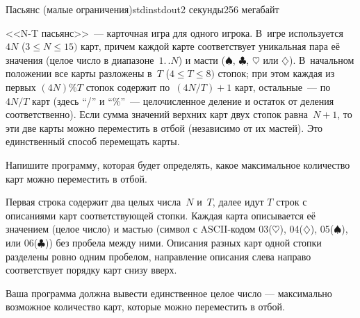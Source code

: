 \begin{problem}{Пасьянс (малые ограничения)}{stdin}{stdout}{2 секунды}{256 мегабайт}

<<N-T пасьянс>>~--- карточная игра для одного игрока. В~игре используется $4N$ 
($3\leqslant N\leqslant 15)$ карт, причем
каждой карте соответствует уникальная пара её значения (целое число 
в диапазоне~$1.\,.N$) и масти ($\spadesuit$, $\clubsuit$, $\heartsuit$
или $\diamondsuit$). В~начальном положении все карты разложены в~$T$ 
($4\leqslant T\leqslant 8)$ стопок; при этом каждая из первых
$(4N)\%T$ стопок содержит по~$(4N/T)+1$ карт, остальные~--- 
по~$4N/T$ карт (здесь ``/'' и ``\%''~--- целочисленное деление и 
остаток от деления соответственно). Если сумма значений верхних карт
двух стопок равна~$N+1$, то эти две карты можно переместить в отбой 
(независимо от их мастей). Это единственный способ перемещать карты.

Напишите программу, которая будет определять, какое максимальное
количество карт можно переместить в отбой.





\InputFile
Первая строка содержит два целых числа~$N$ и~$T$, далее идут $T$ строк 
с описаниями карт соответствующей стопки. Каждая карта описывается 
её значением (целое число) и мастью (символ с ASCII-кодом 03($\heartsuit$), 
04($\diamondsuit$), 05($\spadesuit$), или 06($\clubsuit$)) без пробела 
между ними. Описания разных карт одной стопки разделены ровно одним пробелом,
направление описания слева направо соответствует
порядку карт снизу вверх.


\OutputFile
Ваша программа должна вывести единственное целое число --- максимально возможное количество карт, которые можно переместить в отбой.

\Examples

\begin{example}
%
\end{example}

\end{problem}
